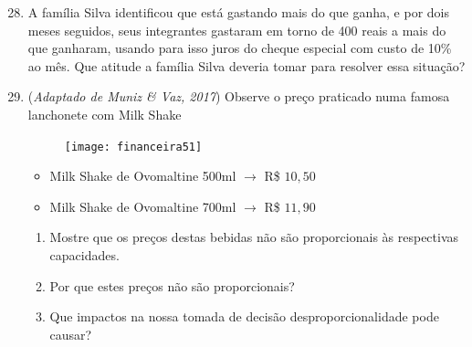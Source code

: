 \begin{enumerate}\setcounter{enumi}{27}
\item A família Silva identificou que está gastando mais do que ganha, e por dois meses seguidos, seus integrantes gastaram em torno de 400 reais a mais do que ganharam, usando para isso juros do cheque especial com custo de 10\% ao mês. Que atitude a família Silva deveria tomar para resolver essa situação? 

\item (\textit{Adaptado de Muniz \& Vaz, 2017}) Observe o preço praticado numa famosa lanchonete com Milk Shake

\begin{figure}[H]
\centering

\texttt{[image: financeira51]}
\end{figure}

\begin{itemize}
  \item Milk Shake de Ovomaltine 500ml $\rightarrow$ R\$ $10{,}50$
  \item Milk Shake de Ovomaltine 700ml $\rightarrow$ R\$ $11{,}90$
\end{itemize}

\begin{enumerate}
  \item Mostre que os preços destas bebidas não são proporcionais às respectivas capacidades.
  \item Por que estes preços não são proporcionais?
  \item Que impactos na nossa tomada de decisão desproporcionalidade pode causar?
\end{enumerate}


\end{enumerate}

\ifnum{}
\notasfinais
\else
\fi






\ifnum{}
\nocite{*}
\else
\fi

